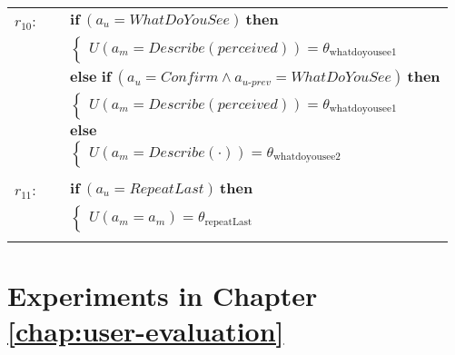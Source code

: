 \begin{small}
\begin{longtable}{p{1cm}p{14cm}}
$r_{10}$: \ \ & $ \textbf{if} \ (\mathit{a_u}\!=\!\mathit{WhatDoYouSee}) \ \textbf{then} $ \\
 & \;\;\;\;\; $ \begin{cases}U(\mathit{a_m}\!=\!\mathit{Describe({perceived})})\!=\!\theta_{\mathrm{whatdoyousee1}} \end{cases}$\\ & $ \textbf{else if} \ (\mathit{a_u}\!=\!\mathit{Confirm} \land \mathit{a_{u\mbox{-}prev}}\!=\!\mathit{WhatDoYouSee}) \ \textbf{then}$ \\
& \;\;\;\;\; $ \begin{cases}U(\mathit{a_m}\!=\!\mathit{Describe({perceived})})\!=\!\theta_{\mathrm{whatdoyousee1}} \end{cases}$\\ & $ \textbf{else}$ \\
& \;\;\;\;\; $ \begin{cases}U(\mathit{a_m}\!=\!\mathit{Describe(\cdot)})\!=\!\theta_{\mathrm{whatdoyousee2}} \end{cases}$ \\ \\[-2mm]
$r_{11}$: \ \ & $ \textbf{if} \ (\mathit{a_u}\!=\!\mathit{RepeatLast}) \ \textbf{then} $ \\
 & \;\;\;\;\; $ \begin{cases}U(\mathit{a_m}\!=\!\mathit{{a_m}})\!=\!\theta_{\mathrm{repeatLast}} \end{cases}$ \\ \\[-2mm]
\end{longtable}
\end{small}

\section{Experiments in Chapter \ref{chap:user-evaluation}}


